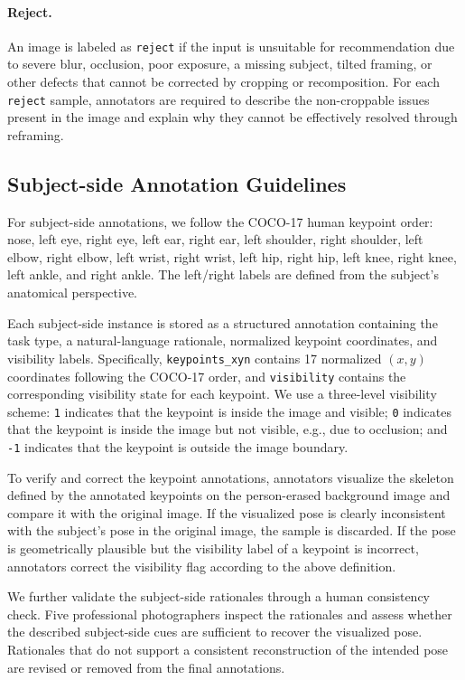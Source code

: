 \documentclass{llmxive}
\begin{document}
\paragraph{Reject.}
An image is labeled as \texttt{reject} if the input is unsuitable for recommendation due to severe blur, occlusion, poor exposure, a missing subject, tilted framing, or other defects that cannot be corrected by cropping or recomposition. For each \texttt{reject} sample, annotators are required to describe the non-croppable issues present in the image and explain why they cannot be effectively resolved through reframing.
\subsection{Subject-side Annotation Guidelines}
\label{app:subject_guidelines}

For subject-side annotations, we follow the COCO-17 human keypoint order: nose, left eye, right eye, left ear, right ear, left shoulder, right shoulder, left elbow, right elbow, left wrist, right wrist, left hip, right hip, left knee, right knee, left ankle, and right ankle. The left/right labels are defined from the subject's anatomical perspective.

Each subject-side instance is stored as a structured annotation containing the task type, a natural-language rationale, normalized keypoint coordinates, and visibility labels. Specifically, \texttt{keypoints\_xyn} contains 17 normalized $(x,y)$ coordinates following the COCO-17 order, and \texttt{visibility} contains the corresponding visibility state for each keypoint. We use a three-level visibility scheme: \texttt{1} indicates that the keypoint is inside the image and visible; \texttt{0} indicates that the keypoint is inside the image but not visible, e.g., due to occlusion; and \texttt{-1} indicates that the keypoint is outside the image boundary.

To verify and correct the keypoint annotations, annotators visualize the skeleton defined by the annotated keypoints on the person-erased background image and compare it with the original image. If the visualized pose is clearly inconsistent with the subject's pose in the original image, the sample is discarded. If the pose is geometrically plausible but the visibility label of a keypoint is incorrect, annotators correct the visibility flag according to the above definition.

We further validate the subject-side rationales through a human consistency check. Five professional photographers inspect the rationales and assess whether the described subject-side cues are sufficient to recover the visualized pose. Rationales that do not support a consistent reconstruction of the intended pose are revised or removed from the final annotations.
\end{document}
